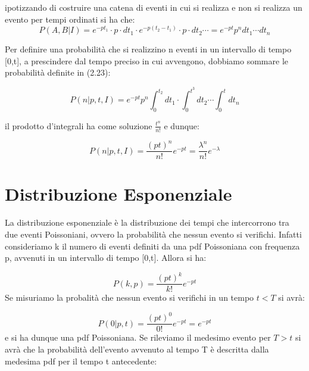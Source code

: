 \documentclass[11pt,a4paper]{book}
\begin{document}
ipotizzando di costruire una catena di eventi in cui si realizza e non si realizza un evento per tempi ordinati si ha che:
\begin{equation}
	P(A,B \vert I) = e^{-pt_1} \cdot p \cdot dt_1 \cdot e^{-p(t_2-t_1)} \cdot p \cdot dt_2 \cdots = e^{-pt}p^ndt_1 \cdots dt_n
\end{equation}

Per definire una probabilit\`{a} che si realizzino n eventi in un intervallo di tempo [0,t], a prescindere dal tempo preciso in cui avvengono, dobbiamo sommare le probabilit\`{a} definite in (2.23):

\begin{equation}
	P(n \vert p,t,I) = e^{-pt}p^n \int_0^{t_2}dt_{1} \cdot \int_{0}^{t^3}dt_{2} \cdots \int_{0}^{t}dt_n
\end{equation}

il prodotto d'integrali ha come soluzione $\frac{t^n}{n!}$ e dunque:

\begin{equation}
	P(n \vert p,t,I) = \dfrac{(pt)^n}{n!}e^{-pt} = \dfrac{\lambda^n}{n!}e^{-\lambda}
\end{equation} 

\section{Distribuzione Esponenziale}

La distribuzione esponenziale \`{e} la distribuzione dei tempi che intercorrono tra due eventi Poissoniani, ovvero la probabilit\`{a} che nessun evento si verifichi. Infatti consideriamo k il numero di eventi definiti da una pdf Poissoniana con frequenza p, avvenuti in un intervallo di tempo [0,t]. Allora si ha:

\begin{equation*}
	P(k,p) = \dfrac{(pt)^k}{k!}e^{-pt}
\end{equation*}
\newline
 Se misuriamo la probalit\`{a} che nessun evento si verifichi in un tempo $t < T$ si avr\`{a}:

\begin{equation*}
	P(0 \vert p,t) = \dfrac{(pt)^0}{0!}e^{-pt} = e^{-pt}
\end{equation*}
\newline
 e si ha dunque una pdf Poissoniana. Se rileviamo il medesimo evento per $T > t$ si avr\`{a} che la probabilit\`{a} dell'evento avvenuto al tempo T \`{e} descritta dalla medesima pdf per il tempo t antecedente:
\end{document}
